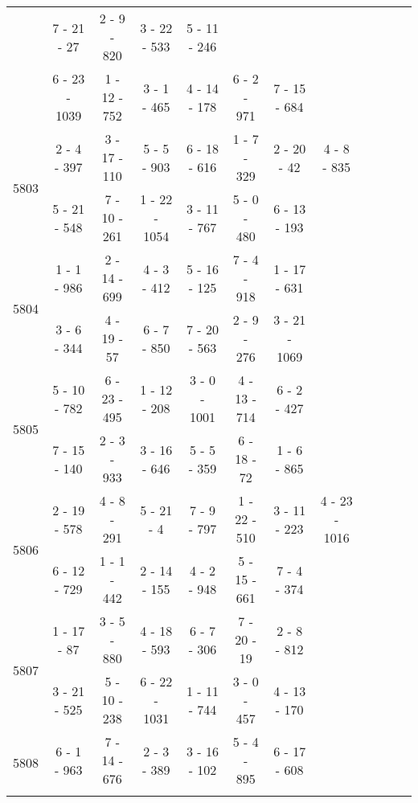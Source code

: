 \begin{longtable}{c | c | c | c | c | c | c | c | c | c | c | c}
&
7 - 21 - 27
&
2 - 9 - 820
&
3 - 22 - 533
&
5 - 11 - 246
&\space\\* \space
&
6 - 23 - 1039
&
1 - 12 - 752
&
3 - 1 - 465
&
4 - 14 - 178
&
6 - 2 - 971
&
7 - 15 - 684
&\space\\\hline
\multirow{2}{*}{5803}
& 2 - 4 - 397
&
3 - 17 - 110
&
5 - 5 - 903
&
6 - 18 - 616
&
1 - 7 - 329
&
2 - 20 - 42
&
4 - 8 - 835
\\* \space
&
5 - 21 - 548
&
7 - 10 - 261
&
1 - 22 - 1054
&
3 - 11 - 767
&
5 - 0 - 480
&
6 - 13 - 193
&\space\\\hline
\multirow{2}{*}{5804}
& 1 - 1 - 986
&
2 - 14 - 699
&
4 - 3 - 412
&
5 - 16 - 125
&
7 - 4 - 918
&
1 - 17 - 631
&\space\\* \space
&
3 - 6 - 344
&
4 - 19 - 57
&
6 - 7 - 850
&
7 - 20 - 563
&
2 - 9 - 276
&
3 - 21 - 1069
&\space\\\hline
\multirow{2}{*}{5805}
& 5 - 10 - 782
&
6 - 23 - 495
&
1 - 12 - 208
&
3 - 0 - 1001
&
4 - 13 - 714
&
6 - 2 - 427
&\space\\* \space
&
7 - 15 - 140
&
2 - 3 - 933
&
3 - 16 - 646
&
5 - 5 - 359
&
6 - 18 - 72
&
1 - 6 - 865
&\space\\\hline
\multirow{2}{*}{5806}
& 2 - 19 - 578
&
4 - 8 - 291
&
5 - 21 - 4
&
7 - 9 - 797
&
1 - 22 - 510
&
3 - 11 - 223
&
4 - 23 - 1016
\\* \space
&
6 - 12 - 729
&
1 - 1 - 442
&
2 - 14 - 155
&
4 - 2 - 948
&
5 - 15 - 661
&
7 - 4 - 374
&\space\\\hline
\multirow{2}{*}{5807}
& 1 - 17 - 87
&
3 - 5 - 880
&
4 - 18 - 593
&
6 - 7 - 306
&
7 - 20 - 19
&
2 - 8 - 812
&\space\\* \space
&
3 - 21 - 525
&
5 - 10 - 238
&
6 - 22 - 1031
&
1 - 11 - 744
&
3 - 0 - 457
&
4 - 13 - 170
&\space\\\hline
\multirow{2}{*}{5808}
& 6 - 1 - 963
&
7 - 14 - 676
&
2 - 3 - 389
&
3 - 16 - 102
&
5 - 4 - 895
&
6 - 17 - 608
&\space\\* \space

\end{longtable}
